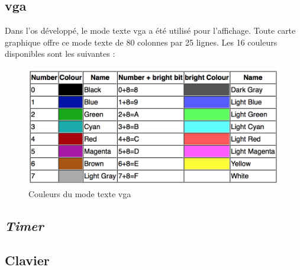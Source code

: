 \subsection{\acrshort{vga}}
Dans l'\acrshort{os} développé, le mode texte \acrshort{vga} a été utilisé pour
l'affichage. Toute carte graphique offre ce mode texte de 80 colonnes par 25 lignes.
Les 16 couleurs disponibles sont les suivantes :\cite{ref19}
\begin{figure}[!h]
  \centering
  \includegraphics[scale=0.7]{images/colors.png}
  \caption{Couleurs du mode texte \acrshort{vga}}
\end{figure}


\subsection{\textit{Timer}}


\subsection{Clavier}